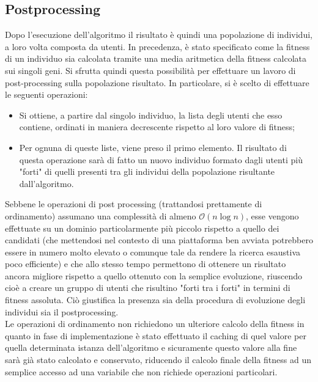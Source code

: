         \subsection{Postprocessing}
            Dopo l'esecuzione dell'algoritmo il risultato è quindi una popolazione di individui, a loro volta composta da utenti. In precedenza, è stato specificato come la fitness di un individuo sia calcolata tramite una media aritmetica della fitness calcolata sui singoli geni. Si sfrutta quindi questa possibilità per effettuare un lavoro di post-processing sulla popolazione risultato. In particolare, si è scelto di effettuare le seguenti operazioni:

            \begin{itemize}
                \item Si ottiene, a partire dal singolo individuo, la lista degli utenti che esso contiene, ordinati in maniera decrescente rispetto al loro valore di fitness;
                \item Per ognuna di queste liste, viene preso il primo elemento. Il risultato di questa operazione sarà di fatto un nuovo individuo formato dagli utenti più "forti" di quelli presenti tra gli individui della popolazione risultante dall'algoritmo.
            \end{itemize}

            Sebbene le operazioni di post processing (trattandosi prettamente di ordinamento) assumano una complessità di almeno $\mathcal{O}(n\log{}n)$, esse vengono effettuate su un dominio particolarmente più piccolo rispetto a quello dei candidati (che mettendosi nel contesto di una piattaforma ben avviata potrebbero essere in numero molto elevato o comunque tale da rendere la ricerca esaustiva poco efficiente) e che allo stesso tempo permettono di ottenere un risultato ancora migliore rispetto a quello ottenuto con la semplice evoluzione, riuscendo cioè a creare un gruppo di utenti che risultino "forti tra i forti" in termini di fitness assoluta. Ciò giustifica la presenza sia della procedura di evoluzione degli individui sia il postprocessing. \\ 
            Le operazioni di ordinamento non richiedono un ulteriore calcolo della fitness in quanto in fase di implementazione è stato effettuato il caching di quel valore per quella determinata istanza dell'algoritmo e sicuramente questo valore alla fine sarà già stato calcolato e conservato, riducendo il calcolo finale della fitness ad un semplice accesso ad una variabile che non richiede operazioni particolari.


